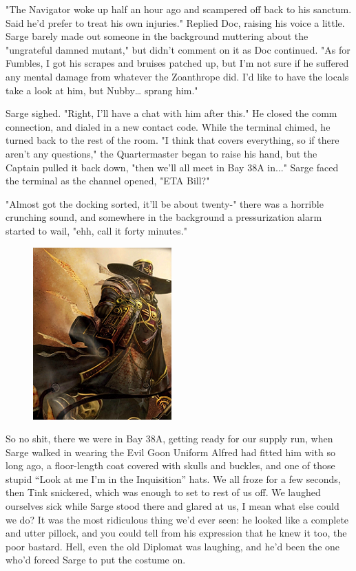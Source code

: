 "The Navigator woke up half an hour ago and scampered off back to his sanctum. 
Said he'd prefer to treat his own injuries." Replied Doc, raising his voice a little. 
Sarge barely made out someone in the background muttering about the "ungrateful damned mutant," but didn't comment on it as Doc continued. 
"As for Fumbles, I got his scrapes and bruises patched up, but I'm not sure if he suffered any mental damage from whatever the Zoanthrope did. 
I'd like to have the locals take a look at him, but Nubby… sprang him."

Sarge sighed. 
"Right, I'll have a chat with him after this." He closed the comm connection, and dialed in a new contact code. 
While the terminal chimed, he turned back to the rest of the room. 
"I think that covers everything, so if there aren't any questions," the Quartermaster began to raise his hand, but the Captain pulled it back down, "then we'll all meet in Bay 38A in..." Sarge faced the terminal as the channel opened, "ETA Bill?"

"Almost got the docking sorted, it’ll be about twenty-" there was a horrible crunching sound, and somewhere in the background a pressurization alarm started to wail, "ehh, call it forty minutes."



\begin{figure}
	\begin{center}
		\includegraphics[width=\figwidth]{pics/14/5.png}
	\end{center}
\end{figure}
So no shit, there we were in Bay 38A, getting ready for our supply run, when Sarge walked in wearing the Evil Goon Uniform Alfred had fitted him with so long ago, a floor-length coat covered with skulls and buckles, and one of those stupid “Look at me I’m in the Inquisition” hats. 
We all froze for a few seconds, then Tink snickered, which was enough to set to rest of us off. 
We laughed ourselves sick while Sarge stood there and glared at us, I mean what else could we do? 
It was the most ridiculous thing we’d ever seen: 
he looked like a complete and utter pillock, and you could tell from his expression that he knew it too, the poor bastard. 
Hell, even the old Diplomat was laughing, and he'd been the one who'd forced Sarge to put the costume on.


